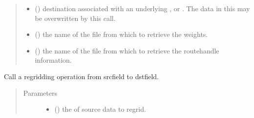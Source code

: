 \documentclass[letterpaper,10pt,english]{sphinxmanual}
\begin{document}
\begin{fulllineitems}
\begin{quote}
\begin{description}
\begin{itemize}
\item {} 
 ({\hyperref[\detokenize{field:ESMF.api.field.Field}]{}}) \textendash{} destination {\hyperref[\detokenize{field:ESMF.api.field.Field}]{}} associated
with an underlying {\hyperref[\detokenize{grid:ESMF.api.grid.Grid}]{}}, {\hyperref[\detokenize{mesh:ESMF.api.mesh.Mesh}]{}}
or {\hyperref[\detokenize{locstream:ESMF.api.locstream.LocStream}]{}}.  The data in this {\hyperref[\detokenize{field:ESMF.api.field.Field}]{}}
may be overwritten by this call.

\item {} 
 () \textendash{} the name of the file from which to retrieve the
weights.

\item {} 
 () \textendash{} the name of the file from which to retrieve the
routehandle information.

\end{itemize}

\end{description}\end{quote}

\begin{fulllineitems}
\label{\detokenize{regridfromfile:ESMF.api.regrid.RegridFromFile.__call__}}
Call a regridding operation from srcfield to dstfield.

\begin{quote}\begin{description}
\item[{Parameters}] \leavevmode\begin{itemize}
\item {} 
 ({\hyperref[\detokenize{field:ESMF.api.field.Field}]{}}) \textendash{} the {\hyperref[\detokenize{field:ESMF.api.field.Field}]{}} of source data to regrid.


\end{itemize}
\end{description}
\end{quote}
\end{fulllineitems}
\end{fulllineitems}
\end{document}
